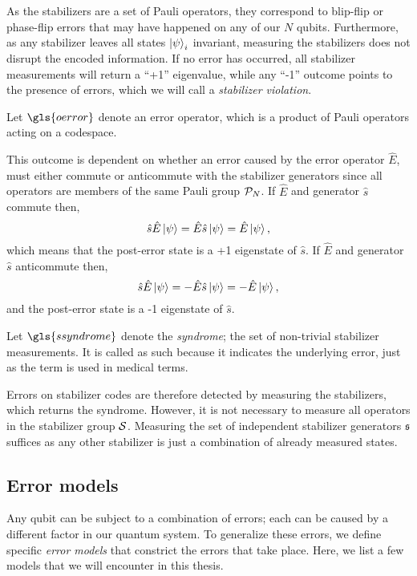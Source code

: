 As the stabilizers are a set of Pauli operators, they correspond to blip-flip or phase-flip errors that may have happened on any of our $N$ qubits. Furthermore, as any stabilizer leaves all states  $\ket{\psi}_i$ invariant, measuring the stabilizers does not disrupt the encoded information. If no error has occurred, all stabilizer measurements will return a ``+1'' eigenvalue, while any ``-1'' outcome points to the presence of errors, which we will call a \emph{stabilizer violation}.
\begin{definition}
  Let $\gls{oerror}$ denote an error operator, which is a product of Pauli operators acting on a codespace. 
\end{definition}
This outcome is dependent on whether an error caused by the error operator $\hat{E}$, must either commute or anticommute with the stabilizer generators since all operators are members of the same Pauli group $\mathcal{P}_N$. If $\hat{E}$ and generator $\hat{s}$ commute then,
\begin{equation}
  \hat{s}\hat{E}\ket{\psi} = \hat{E}\hat{s}\ket{\psi} = \hat{E}\ket{\psi},
\end{equation}
which means that the post-error state is a +1 eigenstate of $\hat{s}$. If $\hat{E}$ and generator $\hat{s}$ anticommute then,
\begin{equation}\label{qec:eq:stabmeas}
  \hat{s}\hat{E}\ket{\psi} = -\hat{E}\hat{s}\ket{\psi} = -\hat{E}\ket{\psi},
\end{equation}
and the post-error state is a -1 eigenstate of $\hat{s}$. 
\begin{definition}\label{def:syndrome}
  Let $\gls{ssyndrome}$ denote the \emph{syndrome}; the set of non-trivial stabilizer measurements. It is called as such because it indicates the underlying error, just as the term is used in medical terms. 
\end{definition}
Errors on stabilizer codes are therefore detected by measuring the stabilizers, which returns the syndrome. However, it is not necessary to measure all operators in the stabilizer group $\mathcal{S}$. Measuring the set of independent stabilizer generators $\mathfrak{s}$ suffices as any other stabilizer is just a combination of already measured states.

\subsection{Error models}\label{qec:sec_errormodels}
Any qubit can be subject to a combination of errors; each can be caused by a different factor in our quantum system. To generalize these errors, we define specific \emph{error models} that constrict the errors that take place. Here, we list a few models that we will encounter in this thesis. 

